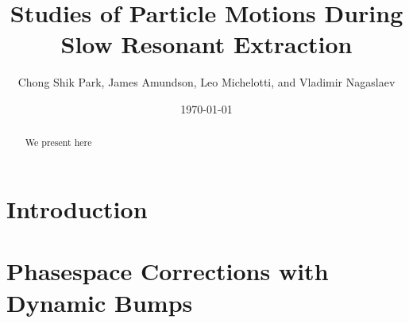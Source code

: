 \documentclass[aps,prstab,onecolumn,preprint,nofootinbib]{revtex4-1}
\begin{document}
\title{Studies of Particle Motions During Slow Resonant Extraction}
\author{Chong Shik Park, James Amundson, Leo Michelotti, and Vladimir Nagaslaev}
\date{\today}

\begin{abstract}
We present here 
\end{abstract}

\pacs{}
\maketitle

\setcounter{tocdepth}{5}


\section{\label{sec:intro}Introduction}

\clearpage
\section{\label{sec:bump}Phasespace Corrections with Dynamic Bumps}
\end{document}
